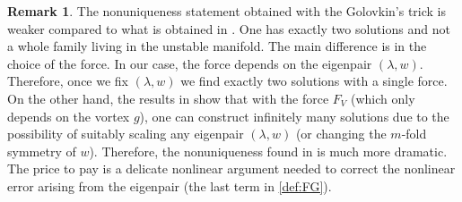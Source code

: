 \documentclass[11pt,reqno]{amsproc}
\theoremstyle{definition}
\newtheorem{remark}[proposition]{Remark}
\theoremstyle{definition}
\numberwithin{equation}{section}
\begin{document}
\begin{remark}
The nonuniqueness statement obtained with the Golovkin's trick is  weaker compared to  what is obtained in \cite{vishik2018instability1,vishik2018instability2,vishik_notes,castro2024proof}. One has exactly two solutions and not a whole family living in the unstable manifold. The main difference is in the choice of the force. In our case, the force depends on the eigenpair $(\lambda,w)$. Therefore, once we fix $(\lambda,w)$ we find exactly two solutions with a single force. On the other hand, the results in \cite{vishik2018instability1,vishik2018instability2,vishik_notes,castro2024proof} show that with the force $F_V$ (which only depends on the vortex $g$), one can construct infinitely many solutions due to the possibility of suitably scaling any eigenpair $(\lambda,w)$ (or changing the $m$-fold symmetry of $w$). Therefore, the nonuniqueness found in \cite{vishik2018instability1,vishik2018instability2,vishik_notes,castro2024proof} is much more dramatic. The price to pay is a delicate nonlinear argument needed to correct the nonlinear error arising from the eigenpair (the last term in \cref{def:FG}).
\end{remark}
\end{document}
